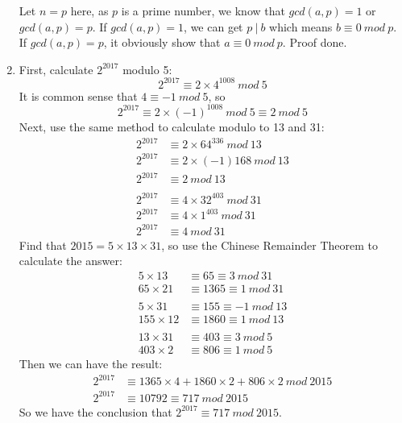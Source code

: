 \documentclass[12pt, a4paper]{article}
\begin{document}
\begin{enumerate}
          Let $n = p$ here, as $p$ is a prime number, we know that $gcd(a, p) = 1$ or $gcd(a, p) = p$.
          If $gcd(a, p) = 1$, we can get $p\ |\ b$ which means $b \equiv 0\ mod\ p$. If $gcd(a, p) = p$, 
          it obviously show that $a \equiv 0\ mod\ p$. Proof done.
    \item First, calculate $2^{2017}$ modulo 5:
          \begin{equation*}
              2^{2017} \equiv 2\times 4^{1008}\ mod\ 5
          \end{equation*}
          It is common sense that $4 \equiv -1\ mod\ 5$, so
          \begin{equation*}
              2^{2017} \equiv 2\times (-1)^{1008}\ mod\ 5 \equiv 2\ mod\ 5
          \end{equation*}
          Next, use the same method to calculate modulo to 13 and 31:
          \begin{align*}
              2^{2017} &\equiv 2\times 64^{336}\ mod\ 13\\
              2^{2017} &\equiv 2\times (-1){168}\ mod\ 13\\
              2^{2017} &\equiv 2\ mod\ 13\\
              \\
              2^{2017} &\equiv 4\times 32^{403}\ mod\ 31\\
              2^{2017} &\equiv 4\times 1^{403}\ mod\ 31\\
              2^{2017} &\equiv 4\ mod\ 31
          \end{align*}
          Find that $2015 = 5\times 13\times 31$, so use the Chinese Remainder Theorem to calculate the answer:
          \begin{align*}
              5\times 13 &\equiv 65 \equiv 3\ mod\ 31\\
              65\times 21 &\equiv 1365 \equiv 1\ mod\ 31\\
              \\
              5\times 31 &\equiv 155 \equiv -1\ mod\ 13\\
              155\times 12 &\equiv 1860 \equiv 1\ mod\ 13\\
              \\
              13\times 31 &\equiv 403 \equiv 3\ mod\ 5\\
              403\times 2 &\equiv 806 \equiv 1\ mod\ 5
          \end{align*}
          Then we can have the result:
          \begin{align*}
            2^{2017} &\equiv 1365\times 4 + 1860\times 2 + 806\times 2\ mod\ 2015\\
            2^{2017} &\equiv 10792 \equiv 717\ mod\ 2015
          \end{align*}
          So we have the conclusion that $2^{2017} \equiv 717\ mod\ 2015$.
\end{enumerate}
\end{document}
